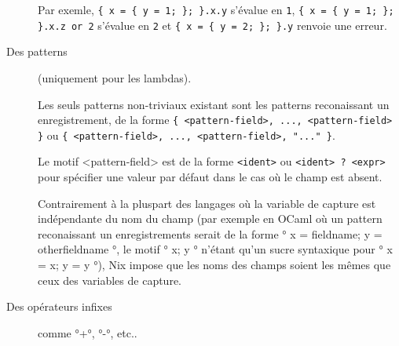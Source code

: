 \begin{description}
    Par exemle, \lstinline|{ x = { y = 1; }; }.x.y| s'évalue en \lstinline{1},
    \lstinline|{ x = { y = 1; }; }.x.z or 2| s'évalue en \lstinline{2} et
    \lstinline|{ x = { y = 2; }; }.y| renvoie une erreur.

  \item[Des patterns] (uniquement pour les lambdas).

    Les seuls patterns non-triviaux existant sont les patterns reconaissant un
    enregistrement, de la forme
    \lstinline|{ <pattern-field>, ..., <pattern-field> }| %
    ou
    \lstinline|{ <pattern-field>, ..., <pattern-field>, "..." }|. %

    Le motif <pattern-field> est de la forme \lstinline{<ident>} ou
    \lstinline{<ident> ? <expr>} pour spécifier une valeur par défaut dans le
    cas où le champ est absent.

    Contrairement à la pluspart des langages où la variable de capture est
    indépendante du nom du champ (par exemple en OCaml où un pattern
    reconaissant un enregistrements serait de la forme
    °{ x = fieldname; y = otherfieldname }°, le motif °{ x; y }° n'étant qu'un
    sucre syntaxique pour °{ x = x; y = y }°), Nix impose que les noms des
    champs soient les mêmes que ceux des variables de capture.

  \item[Des opérateurs infixes] comme °+°, °-°, etc..

\end{description}

